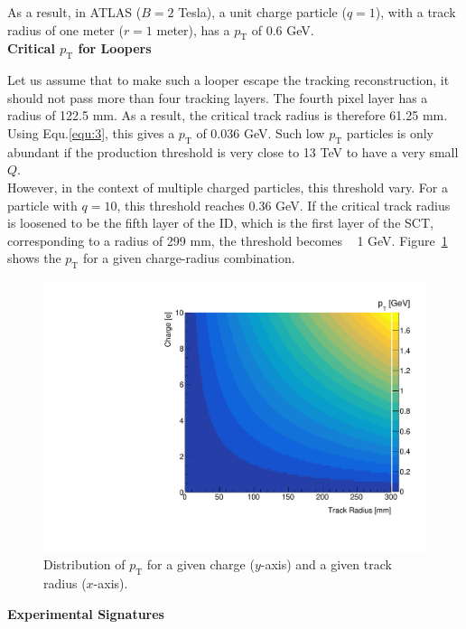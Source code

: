 \documentclass[10pt,letterpaper]{article}
\begin{document}
As a result, in ATLAS ($B = 2$ Tesla), a unit charge particle ($q = 1$), with a
track radius of one meter ($r = 1$ meter), has a $p_{\mathrm{T}}$ of 0.6 GeV.  \\

\textbf{Critical $p_{\mathrm{T}}$ for Loopers}

Let us assume that to make such a looper escape the tracking reconstruction, it
should not pass more than four tracking layers. The fourth pixel layer has a
radius of 122.5 mm. As a result, the critical track radius is therefore 61.25
mm. Using Equ.\ref{equ:3}, this gives a $p_{\mathrm{T}}$ of 0.036 GeV. Such low
$p_{\mathrm{T}}$ particles is only abundant if the production threshold is very
close to 13 TeV to have a very small $Q$. \\

However, in the context of multiple charged particles, this threshold vary. For
a particle with $q = 10$, this threshold reaches 0.36 GeV. If the critical
track radius is loosened to be the fifth layer of the ID, which is the first
layer of the SCT, corresponding to a radius of 299 mm, the threshold becomes ~
1 GeV. Figure~\ref{fig:qvsr} shows the $p_{\mathrm{T}}$ for a given
charge-radius combination.\\

\begin{figure}[!thb]
   \centering
   \includegraphics[scale=0.5]{qvsr.pdf}
   \caption{Distribution of $p_{\mathrm{T}}$ for a given charge ($y$-axis) and a given track radius ($x$-axis).}
   \label{fig:qvsr}
\end{figure}

\textbf{Experimental Signatures}
\end{document}
